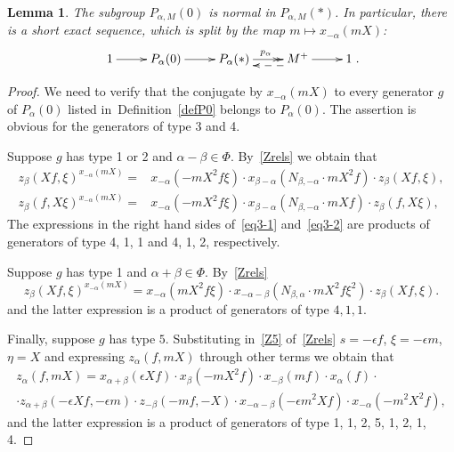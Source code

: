 \documentclass[oneside, 8pt]{amsart}
\newtheorem{lemma}{Lemma}
\theoremstyle{remark}
\theoremstyle{definition}
\numberwithin{equation}{section}
\begin{document}
\begin{lemma}\label{P0_normal} The subgroup $P_{\alpha, M}(0)$ is normal in $P_{\alpha, M}(*)$. In particular, there is a short exact sequence, which is split by the map $m \mapsto x_{-\alpha}(mX)$:
\[\xymatrix{1 \ar[r] & P_\alpha(0) \ar[r] & P_\alpha(*) \ar@{->>}[r]^{p_\alpha} & M^+ \ar@<5pt>@{-->}[l] \ar[r] & 1}.\] \end{lemma}
\begin{proof} We need to verify that the conjugate by $x_{-\alpha}(mX)$ to every generator $g$ of $P_\alpha(0)$ listed in~Definition~\ref{defP0} belongs to $P_\alpha(0)$.
The assertion is obvious for the generators of type 3 and 4.

Suppose $g$ has type 1 or 2 and $\alpha - \beta \in \Phi$. By~\cref{Zrels} we obtain that
\begin{align} z_{\beta}(Xf, \xi) ^ {x_{-\alpha}(mX)} = & x_{-\alpha} (- mX^2f\xi) \cdot x_{\beta-\alpha} (N_{\beta, -\alpha}\cdot mX^2f) \cdot z_{\beta}(Xf, \xi), \label{eq3-1} \\
  z_{\beta}(f, X\xi) ^ {x_{-\alpha}(mX)} = & x_{-\alpha} (- mX^2f\xi ) \cdot x_{\beta-\alpha} (N_{\beta, -\alpha}\cdot mXf) \cdot z_{\beta}(f, X\xi), \label{eq3-2} \end{align}
The expressions in the right hand sides of~\eqref{eq3-1} and~\eqref{eq3-2} are products of generators of type 4, 1, 1 and 4, 1, 2, respectively.  

Suppose $g$ has type 1 and  $\alpha + \beta \in \Phi$. By~\cref{Zrels} 
\begin{equation} \label{eq3-3} z_{\beta}(Xf, \xi) ^ {x_{-\alpha}(mX)} = x_{-\alpha} (mX^2f\xi ) \cdot x_{-\alpha-\beta} (N_{\beta,\alpha}\cdot mX^2f\xi^2) \cdot z_{\beta}(Xf, \xi). \end{equation}
and the latter expression is a product of generators of type $4, 1, 1$.

Finally, suppose $g$ has type $5$.
Substituting in~\eqref{Z5} of~\cref{Zrels} $s = -\epsilon f$, $\xi = -\epsilon m$, $\eta=X$ and expressing $z_\alpha(f, mX)$ through other terms we obtain that
\begin{multline} \label{eq:zalpha} z_\alpha(f, mX) = x_{\alpha+\beta}(\epsilon Xf) \cdot x_{\beta}(-mX^2 f) \cdot x_{-\beta}(mf) \cdot x_\alpha(f) \cdot \\ 
 \cdot z_{\alpha+\beta}(-\epsilon X f, -\epsilon m) \cdot z_{-\beta}(-mf, -X) \cdot x_{-\alpha-\beta}(-\epsilon m^2X f) \cdot x_{-\alpha}(-m^2X^2 f), \end{multline}
and the latter expression is a product of generators of type 1, 1, 2, 5, 1, 2, 1, 4. \end{proof}
\end{document}
